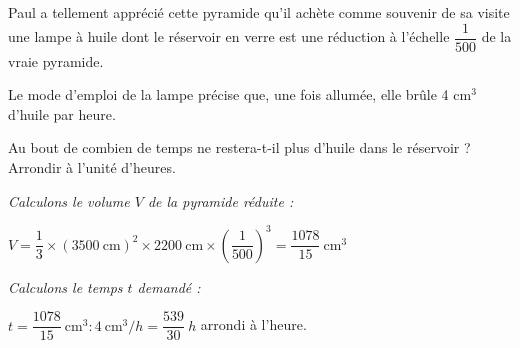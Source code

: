 \documentclass[10pt]{article}
\begin{document}
Paul a tellement apprécié cette pyramide qu'il achète comme souvenir de sa visite une lampe à huile dont le réservoir en verre est une réduction à l'échelle $\dfrac{1}{500}$ de la  vraie pyramide.
 
Le mode d'emploi de la lampe précise que, une fois allumée, elle brûle 4 cm$^3$ d'huile par heure.
 
Au bout de combien de temps ne restera-t-il plus d'huile dans le réservoir ? Arrondir à l'unité d'heures.
 
 
 \textit{Calculons le volume $V$ de la pyramide réduite :}
 
$V=\dfrac{1}{3}\times (3500~\text{cm})^2\times 2200~\text{cm}\times \left(\dfrac{1}{500}\right)^3=\dfrac{1078}{15}~\text{cm}^3$

\textit{Calculons le temps $t$ demandé :}

$t=\dfrac{1078}{15}~\text{cm}^3:4~\text{cm}^3/h=\dfrac{539}{30}~h$ arrondi à l'heure.

 
 
\vspace{0.5cm}
\end{document}
